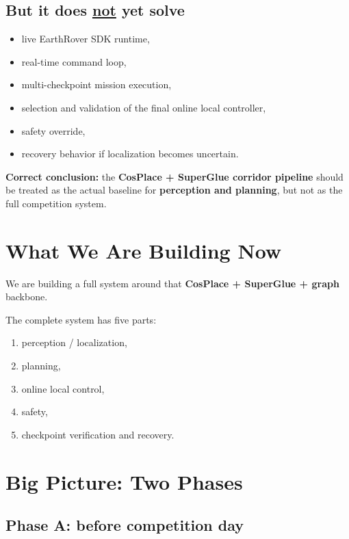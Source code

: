 \documentclass[11pt,a4paper]{article}
\begin{document}
\subsection*{But it does \underline{not} yet solve}

\begin{itemize}[nosep]
  \item live EarthRover SDK runtime,
  \item real-time command loop,
  \item multi-checkpoint mission execution,
  \item selection and validation of the final online local controller,
  \item safety override,
  \item recovery behavior if localization becomes uncertain.
\end{itemize}

\begin{mdframed}
\textbf{Correct conclusion:} the \textbf{CosPlace + SuperGlue corridor pipeline}
should be treated as the actual baseline for \textbf{perception and planning},
but not as the full competition system.
\end{mdframed}


\section{What We Are Building Now}

We are building a full system around that \textbf{CosPlace + SuperGlue + graph}
backbone.

The complete system has five parts:

\begin{enumerate}[nosep]
  \item perception / localization,
  \item planning,
  \item online local control,
  \item safety,
  \item checkpoint verification and recovery.
\end{enumerate}


\section{Big Picture: Two Phases}

\subsection{Phase A: before competition day}
\end{document}
